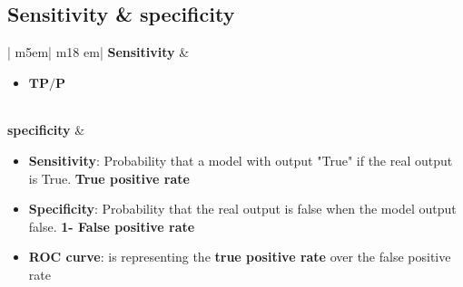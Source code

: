 \subsection{Sensitivity \& specificity}

\begin{table}[!h]
    \begin{center}
    \begin{tabular}{| m{5em}| m{18 em}|}
    \hline
    \centering
     \textbf{Sensitivity} & \begin{itemize}
        \item $\textbf{TP/P}$ 
    \end{itemize}  \\ \hline 
    \centering
     \textbf{specificity}  &  \begin{itemize}
        \item $\textbf{TN/}{\textbf{TN+FP} = 1-FP/N$
    \end{itemize}
    \end{tabular}
    \end{center}
\end{table}
\begin{itemize}
    \item \textbf{Sensitivity}: Probability that a model with output "True" if the real output is True. \textbf{True positive rate}
    \item \textbf{Specificity}: Probability that the real output is false when the model output false. \textbf{1- False positive rate}
    \item \textbf{ROC curve}: is representing the \textbf{true positive rate} over the false positive rate
\end{itemize}




